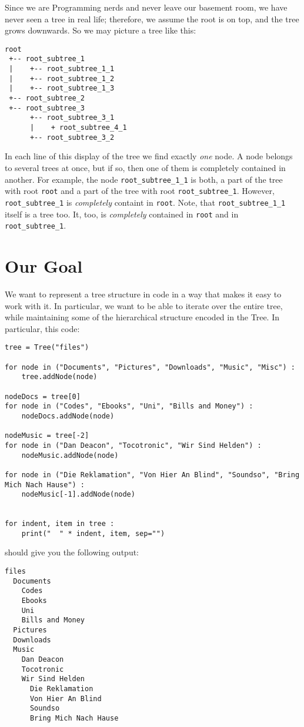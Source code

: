 \documentclass[
	english,
	fontsize=10pt,
	parskip=half,
	titlepage=true,
	DIV=12
]{scrartcl}
\begin{document}
Since we are Programming nerds and never leave our basement room, we have never seen a tree in real life; therefore, we assume the root is on top, and the tree grows downwards. So we may picture a tree like this:
\begin{verbatim}
root
 +-- root_subtree_1
 |    +-- root_subtree_1_1
 |    +-- root_subtree_1_2
 |    +-- root_subtree_1_3
 +-- root_subtree_2
 +-- root_subtree_3
      +-- root_subtree_3_1
      |    + root_subtree_4_1
      +-- root_subtree_3_2
\end{verbatim}
In each line of this display of the tree we find exactly \emph{one} node. A node belongs to several trees at once, but if so, then one of them is completely contained in another. For example, the node \texttt{root\_subtree\_1\_1} is both, a part of the tree with root \texttt{root} and a part of the tree with root \texttt{root\_subtree\_1}. However, \texttt{root\_subtree\_1} is \emph{completely} containt in \texttt{root}. Note, that \texttt{root\_subtree\_1\_1} itself is a tree too. It, too, is \emph{completely} contained in \texttt{root} and in \texttt{root\_subtree\_1}.

\section{Our Goal}
We want to represent a tree structure in code in a way that makes it easy to work with it. In particular, we want to be able to iterate over the entire tree, while maintaining some of the hierarchical structure encoded in the Tree. In particular, this code:

\begin{verbatim}
tree = Tree("files")

for node in ("Documents", "Pictures", "Downloads", "Music", "Misc") :
    tree.addNode(node)

nodeDocs = tree[0]
for node in ("Codes", "Ebooks", "Uni", "Bills and Money") :
    nodeDocs.addNode(node)

nodeMusic = tree[-2]
for node in ("Dan Deacon", "Tocotronic", "Wir Sind Helden") :
    nodeMusic.addNode(node)

for node in ("Die Reklamation", "Von Hier An Blind", "Soundso", "Bring Mich Nach Hause") :
    nodeMusic[-1].addNode(node)


for indent, item in tree :
    print("  " * indent, item, sep="")
\end{verbatim}

should give you the following output:
\begin{verbatim}
files
  Documents
    Codes
    Ebooks
    Uni
    Bills and Money
  Pictures
  Downloads
  Music
    Dan Deacon
    Tocotronic
    Wir Sind Helden
      Die Reklamation
      Von Hier An Blind
      Soundso
      Bring Mich Nach Hause
\end{verbatim}
\end{document}
